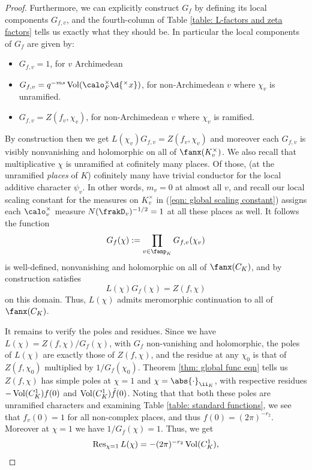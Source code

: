 \documentclass[11pt, x11names, openany]{book}
\begin{document}
\begin{proof}
Furthermore, we can explicitly construct $G_f$ by defining its local components $G_{f, v}$, and the fourth-column of Table \ref{table: L-factors and zeta factors} tells us exactly what they should be. In particular the local components of $G_f$ are given by:
\begin{itemize}
    \item $G_{f, v} =1$, for $v$ Archimedean
    \item $G_{f, v} = q^{-ms} \vol(\calo_F^\times \d{^\times x})$, for non-Archimedean $v$ where $\chi_v$ is unramified.
    \item $G_{f, v} = Z(f_v, \chi_v)$, for non-Archimedean $v$ where $\chi_v$ is ramified.
\end{itemize}
By construction then we get $L(\chi_v) G_{f, v} = Z(f_v, \chi_v)$ and moreover each $G_{f, v}$ is visibly nonvanishing and holomorphic on all of $\fanx(K_v^\times)$. We also recall that multiplicative $\chi$ is unramified at cofinitely many places. Of those, (at the unramified \textit{places} of $K$) cofinitely many have trivial conductor for the local additive character $\psi_v$. In other words, $m_v = 0$ at almost all $v$, and recall our local scaling constant for the measures on $K_v^\times$ in (\ref{eqn: global scaling constant}) assigns each $\calo_v^\times$ measure $N(\frakD_v)^{-1/2} = 1$ at all these places as well. It follows the function
\begin{equation*}
    G_f(\chi) := \prod_{v \in \fanp_K} G_{f, v}(\chi_v)
\end{equation*} 
is well-defined, nonvanishing and holomorphic on all of $\fanx(C_K)$, and by construction satisfies
\begin{equation*}
    L(\chi) G_f(\chi) = Z(f, \chi)
\end{equation*}
on this domain. Thus, $L(\chi)$ admits meromorphic continuation to all of $\fanx(C_K)$.

It remains to verify the poles and residues. Since we have $L(\chi) = Z(f, \chi)/G_f(\chi)$, with $G_f$ non-vanishing and holomorphic, the poles of $L(\chi)$ are exactly those of $Z(f, \chi)$, and the residue at any $\chi_0$ is that of $Z(f, \chi_0)$ multiplied by $1/G_f(\chi_0)$. Theorem \ref{thm: global func eqn} tells us $Z(f, \chi)$ has simple poles at $\chi = 1$ and $\chi = \abs{\cdot}_{\ii_K}$, with respective residues $- \operatorname{Vol}(C^1_K) f(0)$ and $\operatorname{Vol}(C^1_K) \hat{f}(0)$. Noting that that both these poles are unramified characters and examining Table \ref{table: standard functions}, we see that $f_v(0) = 1$ for all non-complex places, and thus $f(0) = (2\pi)^{-r_2}$. Moreover at $\chi = 1$ we have $1/G_f(\chi) = 1$. Thus, we get
\begin{equation*}
    \operatorname{Res}_{\chi = 1} L(\chi) = -(2 \pi)^{-r_2} \operatorname{Vol}(C^1_K),
\end{equation*}


\end{proof}
\end{document}
